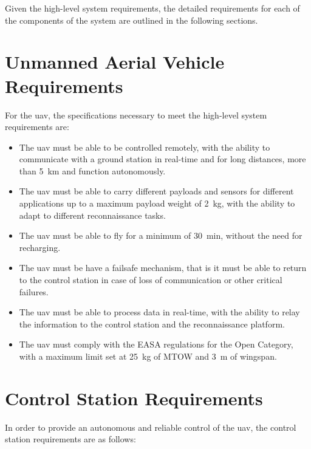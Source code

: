 Given the high-level system requirements, the detailed requirements for each of the components of the system are outlined in the following sections.

\section{Unmanned Aerial Vehicle Requirements}

For the \gls{uav}, the specifications necessary to meet the high-level system requirements are:

\begin{itemize}
  \item The \gls{uav} must be able to be controlled remotely, with the ability to communicate with a ground station in real-time and for long distances, more than \SI{5}{\kilo\meter} and function autonomously.

  \item The \gls{uav} must be able to carry different payloads and sensors for different applications up to a maximum payload weight of \SI{2}{\kilogram}, with the ability to adapt to different reconnaissance tasks.

  \item The \gls{uav} must be able to fly for a minimum of \SI{30}{\minute}, without the need for recharging.

  \item The \gls{uav} must be have a failsafe mechanism, that is it must be able to return to the control station in case of loss of communication or other critical failures.

  \item The \gls{uav} must be able to process data in real-time, with the ability to relay the information to the control station and the reconnaissance platform.

  \item The \gls{uav} must comply with the EASA regulations for the Open Category, with a maximum limit set at \SI{25}{\kilogram} of MTOW and \SI{3}{\meter} of wingspan.
\end{itemize}

\section{Control Station Requirements}

In order to provide an autonomous and reliable control of the \gls{uav}, the control station requirements are as follows:


